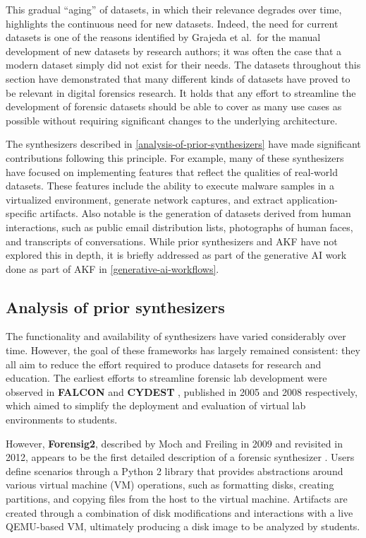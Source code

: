 \documentclass[final,5p,times,twocolumn]{elsarticle}
\begin{document}
This gradual ``aging'' of datasets, in which their relevance degrades
over time, highlights the continuous need for new datasets. Indeed, the
need for current datasets is one of the reasons identified by Grajeda et
al.~for the manual development of new datasets by research authors; it
was often the case that a modern dataset simply did not exist for their
needs. The datasets throughout this section have demonstrated that many
different kinds of datasets have proved to be relevant in digital
forensics research. It holds that any effort to streamline the
development of forensic datasets should be able to cover as many use
cases as possible without requiring significant changes to the
underlying architecture.

The synthesizers described in \autoref{analysis-of-prior-synthesizers}
have made significant contributions following this principle. For
example, many of these synthesizers have focused on implementing
features that reflect the qualities of real-world datasets. These
features include the ability to execute malware samples in a virtualized
environment, generate network captures, and extract application-specific
artifacts. Also notable is the generation of datasets derived from human
interactions, such as public email distribution lists, photographs of
human faces, and transcripts of conversations. While prior synthesizers
and AKF have not explored this in depth, it is briefly addressed as part
of the generative AI work done as part of AKF in \autoref{generative-ai-workflows}.

\subsection{Analysis of prior
synthesizers}\label{analysis-of-prior-synthesizers}

The functionality and availability of synthesizers have varied
considerably over time. However, the goal of these frameworks has
largely remained consistent: they all aim to reduce the effort required
to produce datasets for research and education. The earliest efforts to
streamline forensic lab development were observed in \textbf{FALCON}
\citep{adelsteinAutomaticallyCreatingRealistic2005} and
\textbf{CYDEST} \citep{bruecknerAutomatedComputerForensics2008},
published in 2005 and 2008 respectively, which aimed to simplify the
deployment and evaluation of virtual lab environments to students.

However, \textbf{Forensig2}, described by Moch and Freiling in 2009 and
revisited in 2012, appears to be the first detailed description of a
forensic synthesizer
\citep{mochForensicImageGenerator2009,mochEvaluatingForensicImage2012}.
Users define scenarios through a Python 2 library that provides
abstractions around various virtual machine (VM) operations, such as
formatting disks, creating partitions, and copying files from the host
to the virtual machine. Artifacts are created through a combination of
disk modifications and interactions with a live QEMU-based VM,
ultimately producing a disk image to be analyzed by students.
\end{document}
